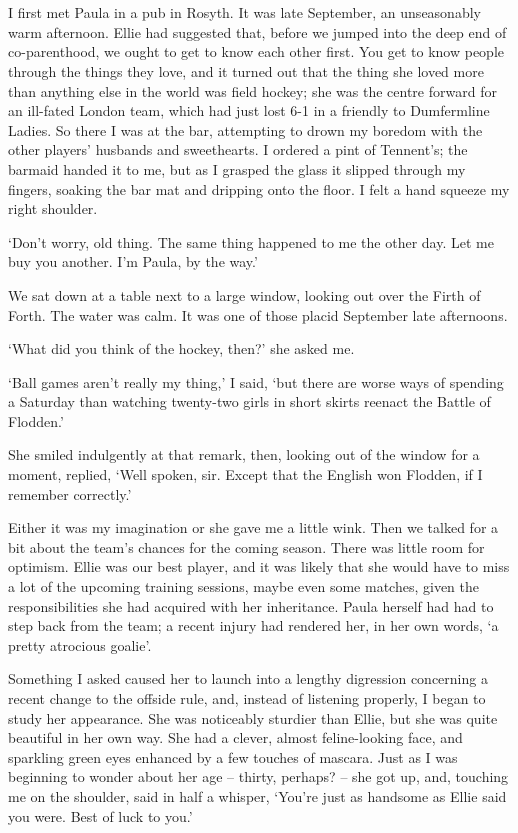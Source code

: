 \section{}

I first met Paula in a pub in Rosyth. It was late September, an unseasonably warm afternoon. Ellie had suggested that, before we jumped into the deep end of co-parenthood, we ought to get to know each other first. You get to know people through the things they love, and it turned out that the thing she loved more than anything else in the world was field hockey; she was the centre forward for an ill-fated London team, which had just lost 6-1 in a friendly to Dumfermline Ladies. So there I was at the bar, attempting to drown my boredom with the other players' husbands and sweethearts. I ordered a pint of Tennent's; the barmaid handed it to me, but as I grasped the glass it slipped through my fingers, soaking the bar mat and dripping onto the floor. I felt a hand squeeze my right shoulder.

`Don't worry, old thing. The same thing happened to me the other day. Let me buy you another. I'm Paula, by the way.'

We sat down at a table next to a large window, looking out over the Firth of Forth. The water was calm. It was one of those placid September late afternoons.

`What did you think of the hockey, then?' she asked me.

`Ball games aren't really my thing,' I said, `but there are worse ways of spending a Saturday than watching twenty-two girls in short skirts reenact the Battle of Flodden.'

She smiled indulgently at that remark, then, looking out of the window for a moment, replied, `Well spoken, sir. Except that the English won Flodden, if I remember correctly.'

Either it was my imagination or she gave me a little wink. Then we talked for a bit about the team's chances for the coming season. There was little room for optimism. Ellie was our best player, and it was likely that she would have to miss a lot of the upcoming training sessions, maybe even some matches, given the responsibilities she had acquired with her inheritance. Paula herself had had to step back from the team; a recent injury had rendered her, in her own words, `a pretty atrocious goalie'.

Something I asked caused her to launch into a lengthy digression concerning a recent change to the offside rule, and, instead of listening properly, I began to study her appearance. She was noticeably sturdier than Ellie, but she was quite beautiful in her own way. She had a clever, almost feline-looking face, and sparkling green eyes enhanced by a few touches of mascara. Just as I was beginning to wonder about her age -- thirty, perhaps? -- she got up, and, touching me on the shoulder, said in half a whisper, `You're just as handsome as Ellie said you were. Best of luck to you.'


